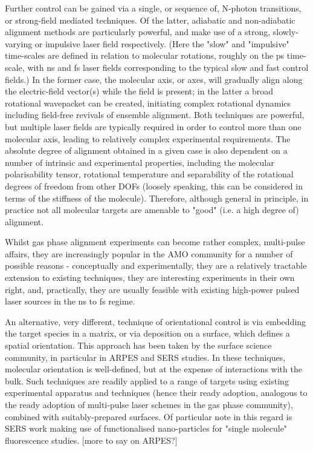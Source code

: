 Further control can be gained via a single, or sequence of, N-photon transitions, or strong-field mediated techniques. Of the latter, adiabatic and non-adiabatic alignment methods are particularly powerful, and make use of a strong, slowly-varying or impulsive laser field respectively. (Here the "slow" and "impulsive" time-scales are defined in relation to molecular rotations, roughly on the ps time-scale, with ns and fs laser fields corresponding to the typical slow and fast control fields.) In the former case, the molecular axis, or axes, will gradually align along the electric-field vector(s) while the field is present; in the latter a broad rotational wavepacket can be created, initiating complex rotational dynamics including field-free revivals of ensemble alignment. Both techniques are powerful, but multiple laser fields are typically required in order to control more than one molecular axis, leading to relatively complex experimental requirements. The absolute degree of alignment obtained in a given case is also dependent on a number of intrinsic and experimental properties, including the molecular polarisability tensor, rotational temperature and separability of the rotational degrees of freedom from other DOFs (loosely speaking, this can be considered in terms of the stiffness of the molecule). Therefore, although general in principle, in practice not all molecular targets are amenable to "good" (i.e. a high degree of) alignment. 

Whilst gas phase alignment experiments can become rather complex, multi-pulse affairs, they are increasingly popular in the AMO community for a number of possible reasons - conceptually and experimentally, they are a relatively tractable extension to existing techniques, they are interesting experiments in their own right, and, practically, they are usually feasible with existing high-power pulsed laser sources in the ns to fs regime. 

An alternative, very different, technique of orientational control is via embedding the target species in a matrix, or via deposition on a surface, which defines a spatial orientation. This approach has been taken by the surface science community, in particular in ARPES and SERS studies. In these techniques, molecular orientation is well-defined, but at the expense of interactions with the bulk. Such techniques are readily applied to a range of targets using existing experimental apparatus and techniques (hence their ready adoption, analogous to the ready adoption of multi-pulse laser schemes in the gas phase community), combined with suitably-prepared surfaces. Of particular note in this regard is SERS work making use of functionalised nano-particles for "single molecule" fluorescence studies. [more to say on ARPES?]

